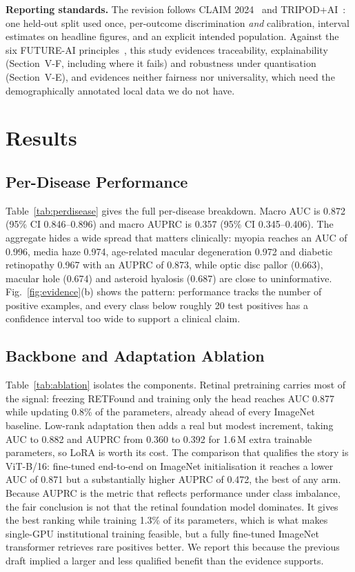 \documentclass[11pt]{IEEEtran}
\begin{document}
\textbf{Reporting standards.} The revision follows CLAIM 2024~\cite{claim2024} and
TRIPOD+AI~\cite{tripodai2024}: one held-out split used once, per-outcome discrimination
\emph{and} calibration, interval estimates on headline figures, and an explicit intended
population. Against the six FUTURE-AI principles~\cite{futureai2025}, this study evidences
traceability, explainability (Section~V-F, including where it fails) and robustness under
quantisation (Section~V-E), and evidences neither fairness nor universality, which need the
demographically annotated local data we do not have.

\section{Results}
\label{sec:results}

\subsection{Per-Disease Performance}
Table~\ref{tab:perdisease} gives the full per-disease breakdown. Macro AUC is
0.872 (95\% CI 0.846--0.896) and macro AUPRC is 0.357 (95\% CI 0.345--0.406). The aggregate hides
a wide spread that matters clinically: myopia reaches an AUC of 0.996, media haze 0.974,
age-related macular degeneration 0.972 and diabetic retinopathy 0.967 with an AUPRC of 0.873,
while optic disc pallor (0.663), macular hole (0.674) and asteroid hyalosis
(0.687) are close to uninformative. Fig.~\ref{fig:evidence}(b) shows the pattern: performance
tracks the number of positive examples, and every class below roughly 20 test positives has a
confidence interval too wide to support a clinical claim.



\subsection{Backbone and Adaptation Ablation}
Table~\ref{tab:ablation} isolates the components. Retinal pretraining carries most of the signal:
freezing RETFound and training only the head reaches AUC 0.877 while updating 0.8\% of the
parameters, already ahead of every ImageNet baseline. Low-rank adaptation then adds a real but
modest increment, taking AUC to 0.882 and AUPRC from 0.360 to 0.392 for 1.6\,M extra trainable
parameters, so LoRA is worth its cost. The comparison that qualifies the story is ViT-B/16: fine-tuned
end-to-end on ImageNet initialisation it reaches a lower AUC of 0.871 but a substantially higher
AUPRC of 0.472, the best of any arm. Because AUPRC is the metric that reflects performance under
class imbalance, the fair conclusion is not that the retinal foundation model dominates. It gives
the best ranking while training 1.3\% of its parameters, which is what makes single-GPU
institutional training feasible, but a fully fine-tuned ImageNet transformer retrieves rare
positives better. We report this because the previous draft implied a larger and less qualified
benefit than the evidence supports.
\end{document}
